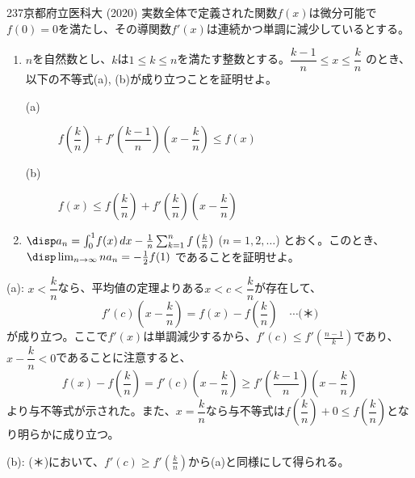 \begin{prob}{237}{}{京都府立医科大 (2020)}
 実数全体で定義された関数$f(x)$は微分可能で $f(0)=0$を満たし、その導関数$f'(x)$は連続かつ単調に減少しているとする。
 \begin{enumerate}
  \item $n$を自然数とし、$k$は$1\le k\le n$を満たす整数とする。$\dfrac{k-1}{n}\le x\le\dfrac{k}{n}$ のとき、以下の不等式(a), (b)が成り立つことを証明せよ。
  \begin{description}
   \item[(a)] $f\left(\dfrac{k}{n}\right)+f'\left(\dfrac{k-1}{n}\right)\left(x-\dfrac{k}{n}\right)\le f(x)$
   \item[(b)] $f(x)\le f\left(\dfrac{k}{n}\right)+f'\left(\dfrac{k}{n}\right)\left(x-\dfrac{k}{n}\right)$
  \end{description}
  \item $\disp a_n=\int_0^1\!f(x) \,dx-\frac{1}{n}\sum_{k=1}^nf\left(\frac{k}{n}\right)$ ($n=1,2,\dots$) とおく。このとき、$\disp \lim_{n\to\infty} na_n=-\frac{1}{2}f(1)$ であることを証明せよ。
 \end{enumerate}
\end{prob}
(a): $x<\dfrac{k}{n}$なら、平均値の定理よりある$x<c<\dfrac{k}{n}$が存在して、
\[ f'(c)\left(x-\frac{k}{n}\right)=f(x)-f(\frac{k}{n}) \quad\cdots\text{(＊)} \]
が成り立つ。ここで$f'(x)$は単調減少するから、$f'(c)\le f'(\frac{n-1}{k})$であり、$x-\dfrac{k}{n}<0$であることに注意すると、
\[ f(x)-f(\frac{k}{n})=f'(c)\left(x-\frac{k}{n}\right)\ge f'\left(\frac{k-1}{n}\right)\left(x-\frac{k}{n}\right) \]
より与不等式が示された。また、$x=\dfrac{k}{n}$なら与不等式は$f\left(\dfrac{k}{n}\right)+0\le f\left(\dfrac{k}{n}\right)$となり明らかに成り立つ。

(b): (＊)において、$f'(c)\ge f'(\frac{k}{n})$から(a)と同様にして得られる。

